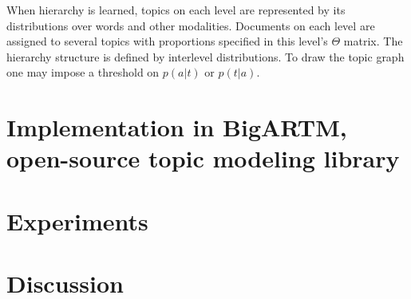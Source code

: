\documentclass[12pt, twoside]{article}
\begin{document}
When hierarchy is learned, topics on each level are represented by its distributions over words and other modalities. Documents on each level are assigned to several topics with proportions specified in this level's $\Theta$ matrix. The hierarchy structure is defined by interlevel distributions. To draw the topic graph one may impose a threshold on $p(a|t)$ or $p(t|a)$.

\section{Implementation in BigARTM, open-source topic modeling library}

\section{Experiments}

\section{Discussion}
\end{document}

